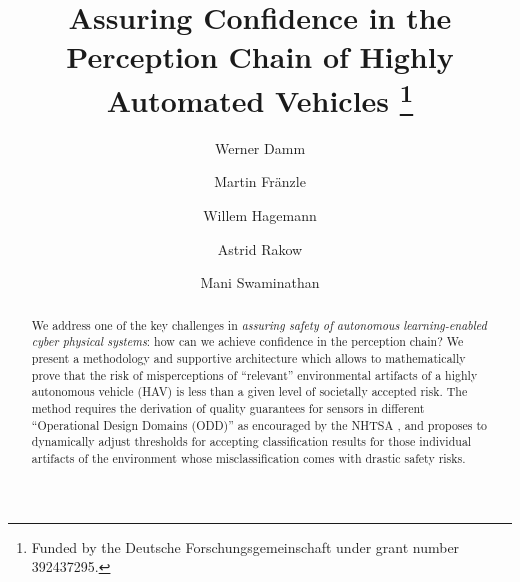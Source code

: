 \documentclass[runningheads]{llncs}
\begin{document}
%
\title{Assuring Confidence in the Perception Chain of Highly Automated Vehicles
\thanks{Funded by the Deutsche Forschungsgemeinschaft under grant number 392437295.}}
%
%
\author{Werner Damm \and
Martin Fr\"anzle  \and
Willem Hagemann  \and
Astrid Rakow  \and
Mani Swaminathan }
%
%
%
\maketitle              %
%
\begin{abstract}
We address one of the key challenges in \emph{assuring safety of autonomous} \emph{learning-enabled cyber physical systems}: how can we achieve confidence in the perception chain? We present a methodology and supportive architecture which allows to mathematically prove that the risk of misperceptions of \enquote{relevant} environmental artifacts of a highly autonomous vehicle (HAV) is less than a given level of societally accepted risk. The method requires the derivation of quality guarantees for sensors in different \enquote{Operational Design Domains (ODD)}  as encouraged by the NHTSA \cite{NHTSF}, and proposes to dynamically adjust thresholds for accepting classification results for those individual artifacts of the environment whose misclassification comes with drastic safety risks. 

\end{abstract}
%
%










\end{document}
